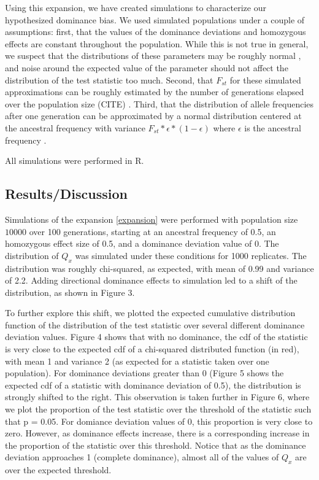 \documentclass[a4paper,12pt]{article}
\newcommand{\jb}[1]{{\color{blue} (#1)} }
\begin{document}
Using this expansion, we have created simulations to characterize our
hypothesized dominance bias. We used simulated populations
under a couple of assumptions: first, that the values of the dominance
deviations and homozygous effects are constant throughout the
population. While this is not true in general, we suspect that the
distributions of these parameters may be roughly normal
\cite{normaldist}, and noise around the expected value of the
parameter should not affect the distribution of the test statistic too
much. Second, that $F_{st}$ for these simulated approximations
can be roughly estimated by the number of generations elapsed over the
population size \jb{CITE}. Third, that the distribution of allele frequencies after
one generation can be approximated by a normal distribution centered
at the ancestral frequency with variance
$F_{st}*\epsilon*(1-\epsilon)$ where $\epsilon$ is the ancestral
frequency \cite{gillespie}.

All simulations were performed in R. 

\subsection*{Results/Discussion}
Simulations of the expansion \eqref{expansion} were performed with
population size $10000$ over 100 generations, starting at an ancestral
frequency of 0.5, an homozygous effect size of 0.5, and a dominance
deviation value of 0. The distribution of $Q_x$ was simulated under
these conditions for 1000 replicates. The distribution was roughly
chi-squared, as expected, with mean of 0.99 and variance of
2.2. Adding directional dominance effects to simulation led to a shift of the
distribution, as shown in Figure 3.

To further explore this shift, we plotted the expected cumulative
distribution function of the distribution of the test statistic over
several different dominance deviation values. Figure 4 shows that with
no dominance, the cdf of the statistic is very close to the expected
cdf of a chi-squared distributed function (in red), with mean 1 and variance 2
(as expected for a statistic taken over one population). For dominance
deviations greater than 0 (Figure 5 shows the expected cdf of a
statistic with dominance deviation of 0.5), the distribution is
strongly shifted to the right. This observation is taken further in
Figure 6, where we plot the proportion of the test statistic over the
threshold of the statistic such that p = 0.05. For domiance deviation
values of 0, this proportion is very close to zero. However, as
dominance effects increase, there is a corresponding increase in the
proportion of the statistic over this threshold. Notice that as the
dominance deviation approaches 1 (complete dominance), almost all of
the values of $Q_x$ are  over the expected threshold.
\end{document}
